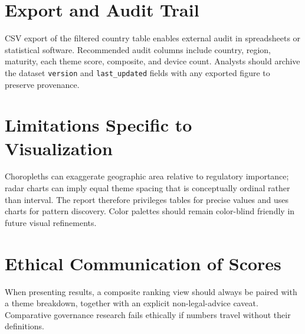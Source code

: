 \section{Export and Audit Trail}
\label{sec:export}

CSV export of the filtered country table enables external audit in spreadsheets or statistical software. Recommended audit columns include country, region, maturity, each theme score, composite, and device count. Analysts should archive the dataset \texttt{version} and \texttt{last\_updated} fields with any exported figure to preserve provenance.

\section{Limitations Specific to Visualization}
\label{sec:vizlim}

Choropleths can exaggerate geographic area relative to regulatory importance; radar charts can imply equal theme spacing that is conceptually ordinal rather than interval. The report therefore privileges tables for precise values and uses charts for pattern discovery. Color palettes should remain color-blind friendly in future visual refinements.


\section{Ethical Communication of Scores}
\label{sec:ethcomm}

When presenting results, a composite ranking view should always be paired with a theme breakdown, together with an explicit non-legal-advice caveat. Comparative governance research fails ethically if numbers travel without their definitions.
